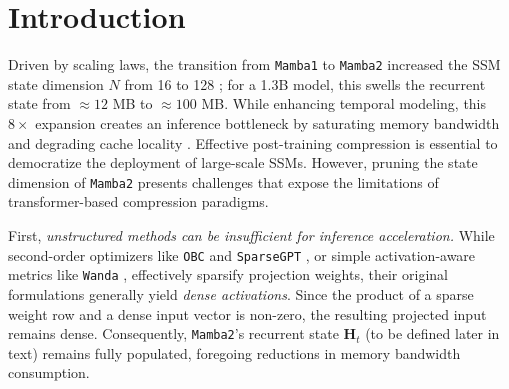 \documentclass{article}
\theoremstyle{plain}
\theoremstyle{definition}
\theoremstyle{remark}
\begin{document}
\begin{abstract}
While \texttt{Mamba2}'s expanded state dimension enhances temporal modeling, it incurs substantial inference overhead that saturates bandwidth during autoregressive generation. Standard pruning methods fail to address this bottleneck: unstructured sparsity leaves activations dense, magnitude-based selection ignores runtime dynamics, and gradient-based methods impose prohibitive costs. We introduce \texttt{GHOST} (Grouped Hidden-state Output-aware Selection and Truncation), a structured pruning framework that approximates control-theoretic balanced truncation using only forward-pass statistics. By jointly measuring controllability and observability, \texttt{GHOST} rivals the fidelity of gradient-based methods without requiring backpropagation. 
As a highlight, on models ranging from 130M to 2.7B parameters, our approach achieves a 50\% state-dimension reduction with approximately 1 perplexity point increase on WikiText-2. Code is available at \url{https://anonymous.4open.science/r/mamba2_ghost-7BCB/}.
\end{abstract}



\section{Introduction}
\label{sec:introduction}

Driven by scaling laws, the transition from \texttt{Mamba1} to \texttt{Mamba2} increased the SSM state dimension $N$ from 16 to 128 \citep{dao_state_2024}; for a 1.3B model, this swells the recurrent state from $\approx 12$ MB to $\approx 100$ MB. While enhancing temporal modeling, this $8 \times$ expansion creates an inference bottleneck by saturating memory bandwidth and degrading cache locality \citep{asif_perfmamba_2025}. Effective post-training compression is essential to democratize the deployment of large-scale SSMs. However, pruning the state dimension of \texttt{Mamba2} presents challenges that expose the limitations of transformer-based compression paradigms. 

First, \textit{unstructured methods can be insufficient for inference acceleration.} While second-order optimizers like \texttt{OBC} \citep{frantar2023optimalbraincompressionframework} and \texttt{SparseGPT} \citep{frantar_SparseGPT_2023}, or simple activation-aware metrics like \texttt{Wanda} \citep{sun_simple_2024}, effectively sparsify projection weights, their original formulations generally yield \textit{dense activations}. Since the product of a sparse weight row and a dense input vector is non-zero, the resulting projected input remains dense. Consequently, \texttt{Mamba2}'s recurrent state $\bm{H}_t$ (to be defined later in text) remains fully populated, foregoing reductions in memory bandwidth consumption.
\end{document}
